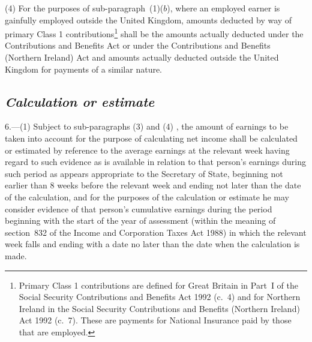 \documentclass[12pt,a4paper]{article}
\begin{document}
(4) For the purposes of sub-paragraph~(1)($b$), where an employed earner is gainfully employed outside the United Kingdom, amounts deducted by way of primary Class 1 contributions\footnote{Primary Class 1 contributions are defined for Great Britain in Part~I of the Social Security Contributions and Benefits Act 1992 (c.~4) and for Northern Ireland in the Social Security Contributions and Benefits (Northern Ireland) Act 1992 (c.~7). These are payments for National Insurance paid by those that are employed.} shall be the amounts actually deducted under the Contributions and Benefits Act or under the Contributions and Benefits (Northern Ireland) Act and amounts actually deducted outside the United Kingdom for payments of a similar nature.


\subsection*{\itshape Calculation or estimate}

6.---(1)  Subject to 
sub-paragraphs (3) and (4)%
, the amount of earnings to be taken into account for the purpose of calculating net income shall be calculated or estimated by reference to the average earnings at the relevant week having regard to such evidence as is available in relation to that person’s earnings during such period as appears appropriate to the Secretary of State, beginning not earlier than 8 weeks before the relevant week and ending not later than the date of the calculation, and for the purposes of the calculation or estimate he may consider evidence of that person’s cumulative earnings during the period beginning with the start of the year of assessment (within the meaning of section~832 of the Income and Corporation Taxes Act 1988) in which the relevant week falls and ending with a date no later than the date when the calculation is made.

\end{document}
